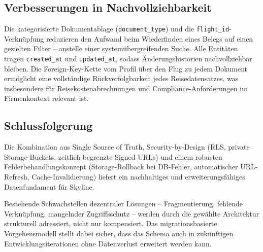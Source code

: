 \subsection{Verbesserungen in Nachvollziehbarkeit}

Die kategorisierte Dokumentablage (\texttt{document\_type}) und die
\texttt{flight\_id}-Verknüpfung reduzieren den Aufwand beim Wiederfinden
eines Belegs auf einen gezielten Filter -- anstelle einer systemübergreifenden Suche.
Alle Entitäten tragen \texttt{created\_at} und \texttt{updated\_at},
sodass Änderungshistorien nachvollziehbar bleiben.
Die Foreign-Key-Kette vom Profil über den Flug zu jedem Dokument
ermöglicht eine vollständige Rückverfolgbarkeit jedes Reisedatensatzes,
was insbesondere für Reisekostenabrechnungen und Compliance-Anforderungen
im Firmenkontext relevant ist.

\subsection{Schlussfolgerung}

Die Kombination aus Single Source of Truth, Security-by-Design (RLS,
private Storage-Buckets, zeitlich begrenzte Signed URLs) und einem
robusten Fehlerbehandlungskonzept (Storage-Rollback bei DB-Fehler,
automatischer URL-Refresh, Cache-Invalidierung) liefert ein nachhaltiges
und erweiterungsfähiges Datenfundament für Skyline.

Bestehende Schwachstellen dezentraler Lösungen -- Fragmentierung,
fehlende Verknüpfung, mangelnder Zugriffsschutz -- werden durch die
gewählte Architektur strukturell adressiert, nicht nur kompensiert.
Das migrationsbasierte Vorgehensmodell stellt dabei sicher, dass das
Schema auch in zukünftigen Entwicklungsiterationen ohne Datenverlust
erweitert werden kann.


